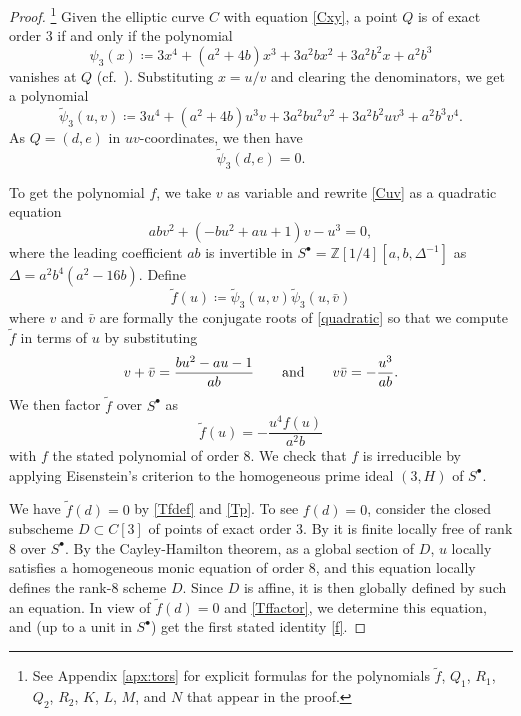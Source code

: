 \documentclass{gtpart}
\theoremstyle{definition}
\theoremstyle{remark}
\newcommand{\mb}[1]{\mathbb{#1}}
\newcommand{\BZ}{{\mb Z}}
\newcommand{\Tf}{\widetilde{f}}
\newcommand{\Tp}{\widetilde{\psi}}
\newcommand{\ad}{{\rm and}}
\newcommand{\s}{S^\bullet}
\begin{document}
\begin{proof}
 \footnote{See Appendix \ref{apx:tors} for explicit formulas for the 
 polynomials $\Tf$, $Q_1$, $R_1$, $Q_2$, $R_2$, $K$, $L$, $M$, and $N$ 
 that appear in the proof.  }
 Given the elliptic curve $C$ with equation \eqref{Cxy}, a point $Q$ is 
 of exact order 3 if and only if the polynomial 
 \[
  \psi_3 (x) \coloneqq 3 x^4 + (a^2 + 4 b) x^3 + 3 a^2 b x^2 + 3 a^2 b^2 x + a^2 b^3 
 \]
 vanishes at $Q$ (cf.~\cite[Exercise 3.7f]{AEC}).  Substituting 
 $x = u/v$ and clearing the denominators, we get a polynomial 
 \[
  \Tp_3(u,v) \coloneqq 3 u^4 + (a^2 + 4 b) u^3 v + 3 a^2 b u^2 v^2 + 3 a^2 b^2 u v^3 + a^2 b^3 v^4.  
 \]
 As $Q = (d,e)$ in $uv$-coordinates, we then have 
 \begin{equation}
 \label{Tp}
  \Tp_3(d,e) = 0.  
 \end{equation}

 To get the polynomial $f$, we take $v$ as variable and rewrite 
 \eqref{Cuv} as a quadratic equation 
 \begin{equation}
 \label{quadratic}
  a b v^2 + (-b u^2 + a u + 1) v - u^3 = 0, 
 \end{equation}
 where the leading coefficient $a b$ is invertible in 
 $\s = \BZ [1/4] [a, b, \Delta^{-1}]$ as $\Delta = a^2 b^4 (a^2 - 16 b)$.  
 Define 
 \begin{equation}
 \label{Tfdef}
  \Tf(u) \coloneqq \Tp_3(u,v) \Tp_3(u,\bar{v}) 
 \end{equation}
 where $v$ and $\bar{v}$ are formally the conjugate roots of 
 \eqref{quadratic} so that we compute $\Tf$ in terms of $u$ by 
 substituting 
 \[
  v + \bar{v} = \frac{b u^2 - a u - 1}{a b} \qquad \ad \qquad v \bar{v} = -\frac{u^3}{a b}.  
 \]
 We then factor $\Tf$ over $\s$ as 
 \begin{equation}
 \label{Tffactor}
  \Tf(u) = -\frac{u^4 f(u)}{a^2 b} 
 \end{equation}
 with $f$ the stated polynomial of order 8.  We check that $f$ is 
 irreducible by applying Eisenstein's criterion to the homogeneous prime 
 ideal $(3,H)$ of $\s$.  

 We have $\Tf(d) = 0$ by \eqref{Tfdef} and \eqref{Tp}.  To see 
 $f(d) = 0$, consider the closed subscheme $D \subset C[3]$ of points of 
 exact order 3.  By \cite[2.3.1]{KM} it is finite locally free of rank 8 
 over $\s$.  By the Cayley-Hamilton theorem, as a global section of $D$, 
 $u$ locally satisfies a homogeneous monic equation of order 8, and this 
 equation locally defines the rank-8 scheme $D$.  Since $D$ is affine, 
 it is then globally defined by such an equation.  In view of 
 $\Tf(d) = 0$ and \eqref{Tffactor}, we determine this equation, and (up 
 to a unit in $\s$) get the first stated identity \eqref{f}.  


\end{proof}
\end{document}
